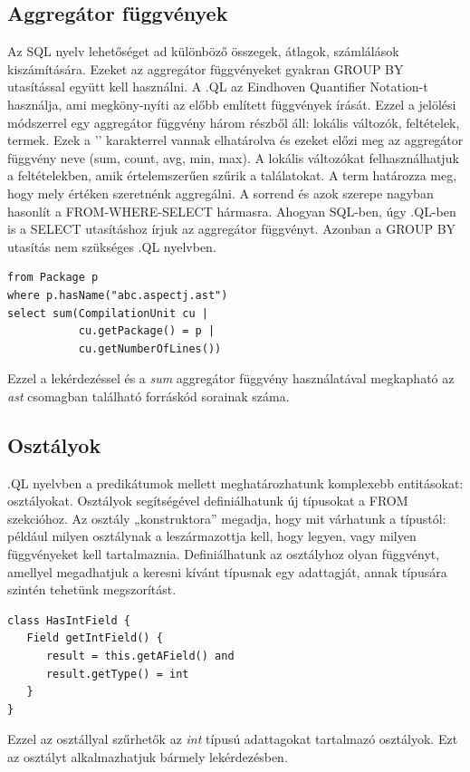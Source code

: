 \documentclass[a4paper,12pt]{report}
\begin{document}
\subsection{Aggregátor függvények}
Az SQL nyelv lehetőséget ad különböző összegek, átlagok, számlálások kiszámítására. Ezeket az aggregátor függvényeket gyakran GROUP BY utasítással együtt kell használni. A .QL az Eindhoven Quantifier Notation-t \cite{eqn_1, eqn_2} használja, ami megköny-nyíti az előbb említett függvények írását. Ezzel a jelölési módszerrel egy aggregátor függvény három részből áll: lokális változók, feltételek, termek. Ezek a '\textbar' karakterrel vannak elhatárolva és ezeket előzi meg az aggregátor függvény neve (sum, count, avg, min, max). A lokális változókat felhasználhatjuk a feltételekben, amik értelemszerűen szűrik a találatokat. A term határozza meg, hogy mely értéken szeretnénk aggregálni. A sorrend és azok szerepe nagyban hasonlít a FROM-WHERE-SELECT hármasra. Ahogyan SQL-ben, úgy .QL-ben is a SELECT utasításhoz írjuk az aggregátor függvényt. Azonban a GROUP BY utasítás nem szükséges .QL nyelvben.
\begin{verbatim}
from Package p
where p.hasName("abc.aspectj.ast")
select sum(CompilationUnit cu |
           cu.getPackage() = p |
           cu.getNumberOfLines())
\end{verbatim}
Ezzel a lekérdezéssel és a \textit{sum} aggregátor függvény használatával megkapható az \textit{ast} csomagban található forráskód sorainak száma.
\subsection{Osztályok}
.QL nyelvben a predikátumok mellett meghatározhatunk komplexebb entitásokat: osztályokat. Osztályok segítségével definiálhatunk új típusokat a FROM szekcióhoz. Az osztály „konstruktora” megadja, hogy mit várhatunk a típustól: például milyen osztálynak a leszármazottja kell, hogy legyen, vagy milyen függvényeket kell tartalmaznia. Definiálhatunk az osztályhoz olyan függvényt, amellyel megadhatjuk a keresni kívánt típusnak egy adattagját, annak típusára szintén tehetünk megszorítást.
\begin{verbatim}
class HasIntField {
   Field getIntField() {
      result = this.getAField() and
      result.getType() = int
   }
}
\end{verbatim}
Ezzel az osztállyal szűrhetők az \textit{int} típusú adattagokat tartalmazó osztályok. Ezt az osztályt alkalmazhatjuk bármely lekérdezésben.
\end{document}
